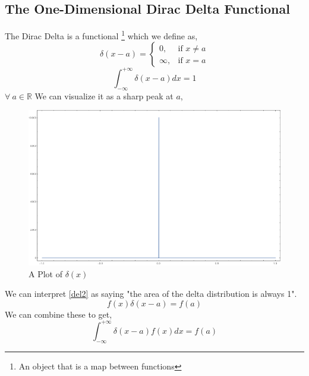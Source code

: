 \subsection{The One-Dimensional Dirac Delta Functional}
The Dirac Delta is a functional \footnote{An object that is a map between functions} which we define as,
\begin{equation} \label{deltadef}
\delta(x-a)= 
\begin{cases}
0, & \text{if } x \neq a\\
\infty,              & \text{if } x = a
\end{cases}
\end{equation}
\begin{equation}
\int_{- \infty}^{+ \infty} \delta(x-a) dx = 1
\label{del2}
\end{equation}
$\forall \  a \in \mathbb{R}$
We can visualize it as a sharp peak at $a$,
\begin{figure}[!ht]
	\centering
	\includegraphics[scale=0.5]{Figures/delta-distribution.png}
	\caption{A Plot of $\delta(x)$}
\end{figure}
We can interpret \ref{del2} as saying "the area of the delta distribution is always 1".
\begin{equation}
f(x)\delta(x - a ) = f(a)
\end{equation}
We can combine these to get,
\begin{equation}
\int_{- \infty}^{+ \infty} \delta(x-a) f(x) dx = f(a)
\end{equation}
